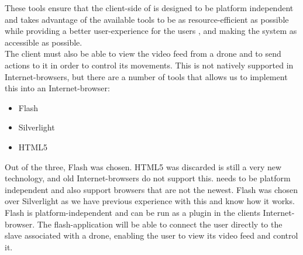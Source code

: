 These tools ensure that the client-side of \projectname{} is designed to be platform independent and takes advantage of the available tools to be as resource-efficient as possible while providing a better user-experience for the users \citep{why_ajax_makes_the_user_experience_better}, and making the system as accessible as possible. \\

The client must also be able to view the video feed from a drone and to send actions to it in order to control its movements.
This is not natively supported in Internet-browsers, but there are a number of tools that allows us to implement this into an Internet-browser:

\begin{itemize}
	\item Flash
	\item Silverlight
	\item HTML5
\end{itemize}

Out of the three, Flash was chosen.
HTML5 was discarded is still a very new technology, and old Internet-browsers do not support this.
\projectname{} needs to be platform independent and also support browsers that are not the newest. 
Flash was chosen over Silverlight as we have previous experience with this and know how it works. \\

Flash is platform-independent and can be run as a plugin in the clients Internet-browser.
The flash-application will be able to connect the user directly to the slave associated with a drone, enabling the user to view its video feed and control it.

